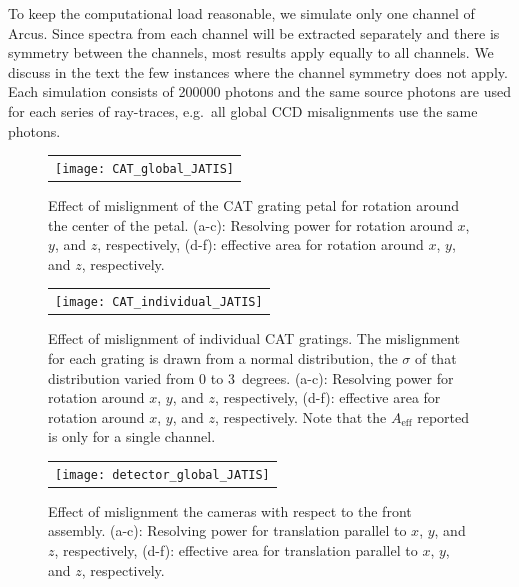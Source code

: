 \documentclass[12pt]{spieman}  %
\begin{document}
\begin{spacing}{2}
To keep the computational load reasonable, we simulate only one channel of Arcus. Since spectra from each channel will be extracted separately and there is symmetry between the channels, most results apply equally to all channels. We discuss in the text the few instances where the channel symmetry does not apply.
Each simulation consists of 200000 photons and the same source photons are used for each series of ray-traces, e.g.\ all global CCD misalignments use the same photons.

\begin{figure} [ht]
    \begin{center}
    \begin{tabular}{c} %
    \texttt{[image: CAT\_global\_JATIS]}
    \end{tabular}
    \end{center}
    \caption {\label{fig:CAT_global}
    Effect of mislignment of the CAT grating petal for rotation around the center of the petal. (a-c): Resolving power for rotation around $x$, $y$, and $z$, respectively, (d-f): effective area for rotation around $x$, $y$, and $z$, respectively.
    }
\end{figure}
\begin{figure} [ht]
    \begin{center}
    \begin{tabular}{c} %
    \texttt{[image: CAT\_individual\_JATIS]}
    \end{tabular}
    \end{center}
    \caption {\label{fig:CAT_individual}
    Effect of mislignment of individual CAT gratings. The mislignment for each grating is drawn from a normal distribution, the $\sigma$ of that distribution varied from 0 to 3~degrees. (a-c): Resolving power for rotation around $x$, $y$, and $z$, respectively, (d-f): effective area for rotation around $x$, $y$, and $z$, respectively. Note that the $A_\mathrm{eff}$ reported is only for a single channel.
    }
\end{figure}
\begin{figure} [ht]
    \begin{center}
    \begin{tabular}{c} %
    \texttt{[image: detector\_global\_JATIS]}
    \end{tabular}
    \end{center}
    \caption {\label{fig:detector_global}
    Effect of mislignment the cameras with respect to the front assembly. (a-c): Resolving power for translation parallel to $x$, $y$, and $z$, respectively, (d-f): effective area for translation parallel to $x$, $y$, and $z$, respectively.
    }
\end{figure}


\end{spacing}
\end{document}
